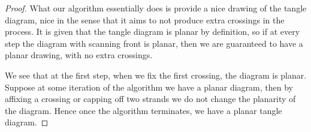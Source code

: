 \begin{proof}
What our algorithm essentially does is provide a nice drawing of the tangle diagram, nice in the sense that it aims to not produce extra crossings in the process. It is given that the tangle diagram is planar by definition, so if at every step the diagram with scanning front is planar, then we are guaranteed to have a planar drawing, with no extra crossings.

We see that at the first step, when we fix the first crossing, the diagram is planar. Suppose at some iteration of the algorithm we have a planar diagram, then by affixing a crossing or capping off two strands we do not change the planarity of the diagram. Hence once the algorithm terminates, we have a planar tangle diagram.
\end{proof}


